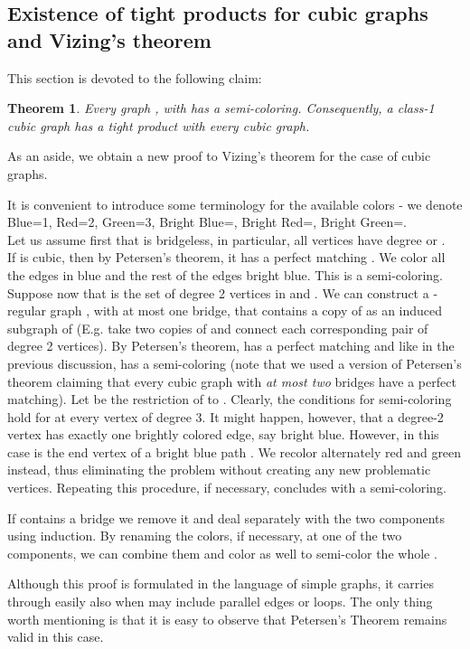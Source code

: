 \documentclass[12pt]{article}
\newtheorem{theorem}{Theorem}[section]
\newtheorem{open question}[theorem]{Open question}
\newcommand{\proof}{{\par\noindent {\bf Proof}\space\space}}
\newcommand{\proofbox}{\begin{flushright}\end{flushright}}
\begin{document}
\subsection{Existence of tight products for cubic graphs and Vizing's theorem}\label{odd regularity}
This section is devoted to the following claim:
\begin{theorem}\label{theorem:3-clorable-graph-has-a-tight-product-with-every-cubic-graph}
Every graph , with  has a semi-coloring. Consequently, a class-1 cubic graph has a tight product with {\em every} cubic graph.
\end{theorem}
As an aside, we obtain a new proof to Vizing's theorem for the case of cubic graphs. 
\proof
It is convenient to introduce some terminology for the available colors - we denote Blue=1, Red=2, Green=3, Bright Blue=, Bright Red=, Bright Green=.\\
Let us assume first that  is bridgeless, in particular, all vertices have degree  or .\\
If  is cubic, then by Petersen's theorem, it has a perfect matching . We color all the edges in  blue and the rest of the edges bright blue. This is a semi-coloring.\\
Suppose now that  is
the set of degree 2 vertices in  and . We can construct a -regular graph , with at most one bridge, that contains a copy of  as an induced subgraph of  (E.g. take two copies of  and connect each corresponding pair of
degree 2 vertices). By Petersen's theorem,  has a perfect matching and like in the previous discussion,  has a semi-coloring  (note that we used a version of Petersen's theorem claiming that every cubic graph with {\em at most two} bridges have a perfect matching). Let  be the restriction of  to . Clearly, the conditions for semi-coloring  hold for  at every vertex  of degree 3. It might happen, however, that a degree-2 vertex  has exactly one brightly colored edge, say bright blue. However, in this case  is the end vertex of a bright blue path . We recolor  alternately red and green instead, thus eliminating the problem without creating any new problematic vertices. Repeating this procedure, if necessary, concludes with a semi-coloring.

If  contains a bridge  we remove it and deal separately with the two components using induction. By renaming the colors, if necessary, at one of the two components, we can combine them and color  as well to semi-color the whole .

Although this proof is formulated in the language of simple graphs, it carries through easily also when  may include parallel edges or
loops. The only thing worth mentioning is that it is easy to observe that Petersen's Theorem remains valid in this case.
\proofbox
\end{document}

